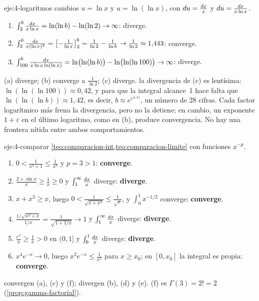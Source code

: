 \begin{solucion}{eje:4-logaritmos}
\planteamiento cambios $u=\ln x$ y $u=\ln(\ln x)$, con $\mathop{}\!d u=\frac{\mathop{}\!d x}{x}$ y $\mathop{}\!d u=\frac{\mathop{}\!d x}{x\ln x}$.
\pasos
\begin{enumerate}[label=(\alph*)]
  \item $\int_2^{b}\frac{\mathop{}\!d x}{x\ln x}=\ln(\ln b)-\ln(\ln2)\to\infty$: diverge.
  \item $\int_2^{b}\frac{\mathop{}\!d x}{x(\ln x)^{2}}=\bigl[-\frac{1}{\ln x}\bigr]_{2}^{b}=\frac{1}{\ln2}-\frac{1}{\ln b}\to\frac{1}{\ln2}\approx1{,}443$: converge.
  \item $\int_{100}^{b}\frac{\mathop{}\!d x}{x\ln x\ln(\ln x)}=\ln\bigl(\ln(\ln b)\bigr)-\ln\bigl(\ln(\ln100)\bigr)\to\infty$: diverge.
\end{enumerate}
\resultado (a) diverge; (b) converge a $\frac{1}{\ln2}$; (c) diverge.
\comprobacion la divergencia de (c) es lentísima: $\ln(\ln(\ln100))\approx0{,}42$, y para que la integral alcance~1 hace falta que $\ln(\ln(\ln b))\approx1{,}42$, es decir, $b\approx e^{e^{4{,}15}}$, un número de 28 cifras. Cada factor logarítmico más frena la divergencia, pero no la detiene; en cambio, un exponente $1+\varepsilon$ en el último logaritmo, como en (b), produce convergencia. No hay una frontera nítida entre ambos comportamientos.
\end{solucion}

\begin{solucion}{eje:4-comparar}
\planteamiento \cref{teo:comparacion-int,teo:comparacion-limite} con funciones $x^{-p}$.
\pasos
\begin{enumerate}[label=(\alph*)]
  \item $0<\frac{1}{x^{3}+1}\le\frac{1}{x^{3}}$ y $p=3>1$: \textbf{converge}.
  \item $\frac{2+\sin x}{x}\ge\frac1x\ge0$ y $\int_1^{\infty}\frac{\mathop{}\!d x}{x}$ diverge: \textbf{diverge}.
  \item $x+x^{3}\ge x$, luego $0<\frac{1}{\sqrt{x+x^{3}}}\le\frac{1}{\sqrt x}$, y $\int_0^{1}x^{-1/2}$ converge: \textbf{converge}.
  \item $\frac{1/\sqrt{x^{2}+x}}{1/x}=\frac{1}{\sqrt{1+1/x}}\to1$ y $\int_1^{\infty}\frac{\mathop{}\!d x}{x}$ diverge: \textbf{diverge}.
  \item $\frac{e^{x}}{x}\ge\frac1x>0$ en $(0,1]$ y $\int_0^{1}\frac{\mathop{}\!d x}{x}$ diverge: \textbf{diverge}.
  \item $x^{4}e^{-x}\to0$, luego $x^{2}e^{-x}\le\frac{1}{x^{2}}$ para $x\ge x_0$; en $[0,x_0]$ la integral es propia: \textbf{converge}.
\end{enumerate}
\resultado convergen (a), (c) y (f); divergen (b), (d) y (e).
\comprobacion (f) es $\Gamma(3)=2!=2$ (\cref{prop:gamma-factorial}).
\end{solucion}


